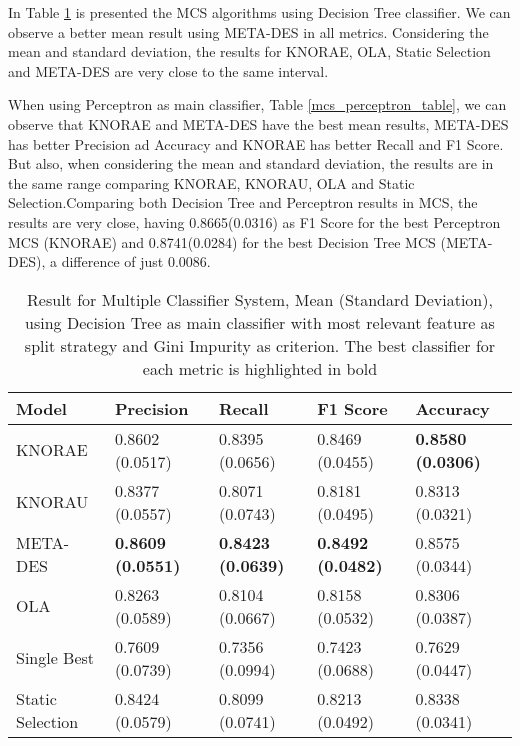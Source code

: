 In Table \ref{mcs_dt_table} is presented the MCS algorithms using Decision Tree classifier. We can observe a better mean result using META-DES in all metrics. Considering the mean and standard deviation, the results for KNORAE, OLA, Static Selection and META-DES are very close to the same interval.

When using Perceptron as main classifier, Table \ref{mcs_perceptron_table}, we can observe that KNORAE and META-DES have the best mean results, META-DES has better Precision ad Accuracy and KNORAE has better Recall and F1 Score. But also, when considering the mean and standard deviation, the results are in the same range comparing KNORAE, KNORAU, OLA and Static Selection.Comparing both Decision Tree and Perceptron results in MCS, the results are very close, having 0.8665(0.0316) as F1 Score for the best Perceptron MCS (KNORAE) and 0.8741(0.0284) for the best Decision Tree MCS (META-DES), a difference of just 0.0086.

\begin{table}[h!]
    \centering
    \renewcommand{\arraystretch}{1.8}
    \begin{tabular}{ p{3cm}p{2.8cm}p{2.8cm}p{2.8cm}p{2.8cm} }
        \toprule
        Model & Precision & Recall & F1 Score & Accuracy \\
        \midrule
        KNORAE &            0.8602 (0.0517) & 0.8395 (0.0656) & 0.8469 (0.0455) & \textbf{0.8580 (0.0306)} \\
        KNORAU &            0.8377 (0.0557) & 0.8071 (0.0743) & 0.8181 (0.0495) & 0.8313 (0.0321) \\
        META-DES &          \textbf{0.8609 (0.0551)} & \textbf{0.8423 (0.0639)} & \textbf{0.8492 (0.0482)} & 0.8575 (0.0344) \\
        OLA &               0.8263 (0.0589) & 0.8104 (0.0667) & 0.8158 (0.0532) & 0.8306 (0.0387) \\
        Single Best &       0.7609 (0.0739) & 0.7356 (0.0994) & 0.7423 (0.0688) & 0.7629 (0.0447) \\
        Static Selection &  0.8424 (0.0579) & 0.8099 (0.0741) & 0.8213 (0.0492) & 0.8338 (0.0341) \\ [1ex]
        \bottomrule
        \end{tabular}
        \caption{%
        Result for Multiple Classifier System, Mean (Standard Deviation), using Decision Tree as main classifier with most relevant feature as split strategy and Gini Impurity as criterion. The best classifier for each metric is highlighted in bold%
        }\label{mcs_dt_table}
\end{table}

